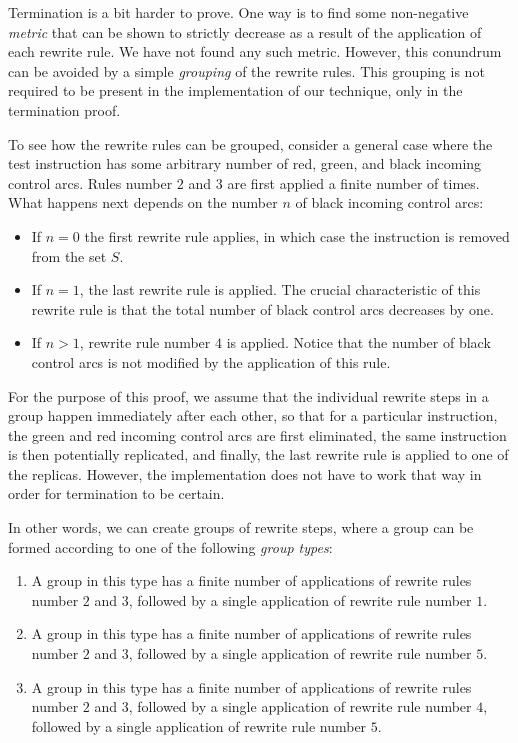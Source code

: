 Termination is a bit harder to prove.  One way is to find some
non-negative \emph{metric} that can be shown to strictly decrease as a
result of the application of each rewrite rule.  We have not found any
such metric.  However, this conundrum can be avoided by a simple
\emph{grouping} of the rewrite rules.  This grouping is not required
to be present in the implementation of our technique, only in the
termination proof.

To see how the rewrite rules can be grouped, consider a general case
where the test instruction has some arbitrary number of red, green,
and black incoming control arcs.  Rules number $2$ and $3$ are first
applied a finite number of times.  What happens next depends on the
number $n$ of black incoming control arcs:

\begin{itemize}
\item If $n=0$ the first rewrite
rule applies, in which case the instruction is removed from the set
$S$.
\item If $n=1$, the last rewrite rule is applied.  The crucial
  characteristic of this rewrite rule is that the total number of
  black control arcs decreases by one.
\item If $n>1$, rewrite rule number $4$ is applied.  Notice that the
  number of black control arcs is not modified by the application of
  this rule.
\end{itemize}

For the purpose of this proof, we assume that the individual rewrite
steps in a group happen immediately after each other, so that for a
particular instruction, the green and red incoming control arcs are
first eliminated, the same instruction is then potentially replicated,
and finally, the last rewrite rule is applied to one of the replicas.
However, the implementation does not have to work that way in order
for termination to be certain.

In other words, we can create groups of rewrite steps, where a group
can be formed according to one of the following \emph{group types}:

\begin{enumerate}
\item A group in this type has a finite number of applications of
  rewrite rules number $2$ and $3$, followed by a single application
  of rewrite rule number $1$.
\item A group in this type has a finite number of applications of
  rewrite rules number $2$ and $3$, followed by a single application
  of rewrite rule number $5$.
\item A group in this type has a finite number of applications of
  rewrite rules number $2$ and $3$, followed by a single application
  of rewrite rule number $4$, followed by a single application of
  rewrite rule number $5$.
\end{enumerate}

